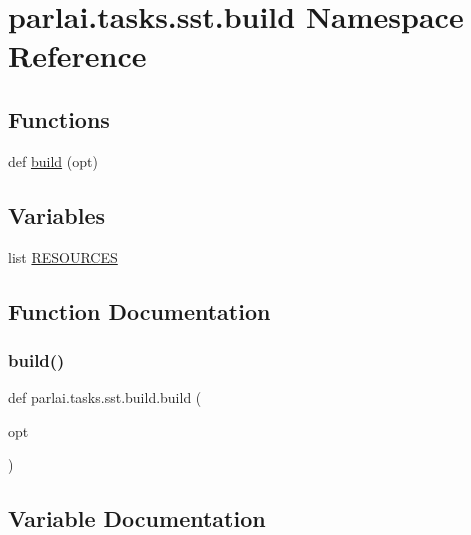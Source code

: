 \hypertarget{namespaceparlai_1_1tasks_1_1sst_1_1build}{}\section{parlai.\+tasks.\+sst.\+build Namespace Reference}
\label{namespaceparlai_1_1tasks_1_1sst_1_1build}
\subsection*{Functions}
\begin{DoxyCompactItemize}
\item 
def \hyperlink{namespaceparlai_1_1tasks_1_1sst_1_1build_af9e8461053fb439f9cf6e16c10bd6f63}{build} (opt)
\end{DoxyCompactItemize}
\subsection*{Variables}
\begin{DoxyCompactItemize}
\item 
list \hyperlink{namespaceparlai_1_1tasks_1_1sst_1_1build_a797248ff2218496585c5d4a8b14bd31e}{R\+E\+S\+O\+U\+R\+C\+ES}
\end{DoxyCompactItemize}


\subsection{Function Documentation}
\mbox{\label{namespaceparlai_1_1tasks_1_1sst_1_1build_af9e8461053fb439f9cf6e16c10bd6f63}} 
\subsubsection{\texorpdfstring{build()}{build()}}
{\footnotesize\ttfamily def parlai.\+tasks.\+sst.\+build.\+build (\begin{DoxyParamCaption}\item[{}]{opt }\end{DoxyParamCaption})}



\subsection{Variable Documentation}
\mbox{\label{namespaceparlai_1_1tasks_1_1sst_1_1build_a797248ff2218496585c5d4a8b14bd31e}} 

